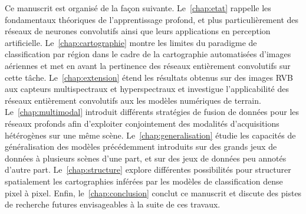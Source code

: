 \medskip

Ce manuscrit est organisé de la façon suivante. Le~\cref{chap:etat} rappelle les fondamentaux théoriques de l'apprentissage profond, et plus particulièrement des réseaux de neurones convolutifs ainsi que leurs applications en perception artificielle. Le~\cref{chap:cartographie} montre les limites du paradigme de classification par région dans le cadre de la cartographie automatisées d'images aériennes et met en avant la pertinence des réseaux entièrement convolutifs sur cette tâche. Le~\cref{chap:extension} étend les résultats obtenus sur des images \gls{RVB} aux capteurs multispectraux et hyperspectraux et investigue l'applicabilité des réseaux entièrement convolutifs aux les modèles numériques de terrain. Le~\cref{chap:multimodal} introduit différents stratégies de fusion de données pour les réseaux profonds afin d'exploiter conjointement des modalités d'acquisitions hétérogènes sur une même scène. Le~\cref{chap:generalisation} étudie les capacités de généralisation des modèles précédemment introduits sur des grands jeux de données à plusieurs scènes d'une part, et sur des jeux de données peu annotés d'autre part. Le~\cref{chap:structure} explore différentes possibilités pour structurer spatialement les cartographies inférées par les modèles de classification dense pixel à pixel. Enfin, le~\cref{chap:conclusion} conclut ce manuscrit et discute des pistes de recherche futures envisageables à la suite de ces travaux.

%
%
\printbibliography
